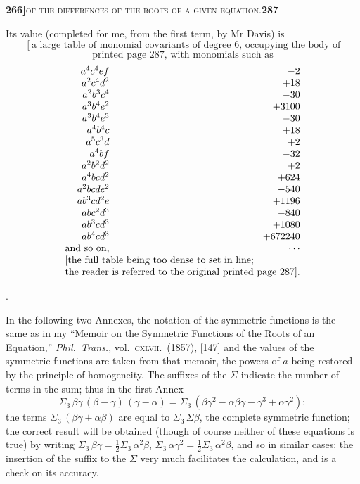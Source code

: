 \documentclass[11pt]{article}
\begin{document}
\newpage
\setcounter{page}{287}

\noindent\textbf{266]}\hfill\textsc{of the differences of the roots of a given equation.}\hfill\textbf{287}

\medskip

\noindent Its value (completed for me, from the first term, by Mr Davis) is
\[
\left[\text{a large table of monomial covariants of degree 6, occupying the body of}\right.
\]
\[
\left.\text{printed page 287, with monomials such as}\right.
\]
\[
\begin{array}{rr}
a^4 c^4 e f       & -2\\
a^2 c^4 d^2       & +18\\
a^2 b^3 c^4       & -30\\
a^3 b^4 e^2       & +3100\\
a^3 b^4 e^3       & -30\\
a^4 b^4 c         & +18\\
a^5 c^3 d         & +2\\
a^4 b f           & -32\\
a^2 b^2 d^2       & +2\\
a^4 b c d^2       & +624\\
a^2 b c d e^2     & -540\\
a b^3 c d^2 e     & +1196\\
a b c^2 d^3       & -840\\
a b^3 c d^3       & +1080\\
a b^4 c d^3       & +672240\\
\text{and so on}, & \cdots\\
\multicolumn{2}{l}{\text{[the full table being too dense to set in line;}}\\
\multicolumn{2}{l}{\text{the reader is referred to the original printed page~287]}.}
\end{array}
\]

\medskip

\noindent [viz.\ this is $= 48\,A J - 80\,H I + 120\,B I - 50\,C O$ as above].

\medskip

\noindent In the following two Annexes, the notation of the symmetric functions is the same as in my ``Memoir on the Symmetric Functions of the Roots of an Equation,'' \textit{Phil.\ Trans.}, vol.~\textsc{cxlvii.}\ (1857), [147] and the values of the symmetric functions are taken from that memoir, the powers of $a$ being restored by the principle of homogeneity. The suffixes of the $\Sigma$ indicate the number of terms in the sum; thus in the first Annex
\[
   \Sigma_3\,\beta\gamma\,(\beta - \gamma)\,(\gamma - \alpha) = \Sigma_3\,(\beta\gamma^2 - \alpha\beta\gamma - \gamma^3 + \alpha\gamma^2);
\]
the terms $\Sigma_3\,(\beta\gamma + \alpha\beta)$ are equal to $\Sigma_3\,\Sigma\beta$, the complete symmetric function; the correct result will be obtained (though of course neither of these equations is true) by writing $\Sigma_3\,\beta\gamma = \tfrac{1}{2}\Sigma_3\,\alpha^2\beta$, $\Sigma_3\,\alpha\gamma^2 = \tfrac{1}{2}\Sigma_3\,\alpha^2\beta$, and so in similar cases; the insertion of the suffix to the $\Sigma$ very much facilitates the calculation, and is a check on its accuracy.
\end{document}
